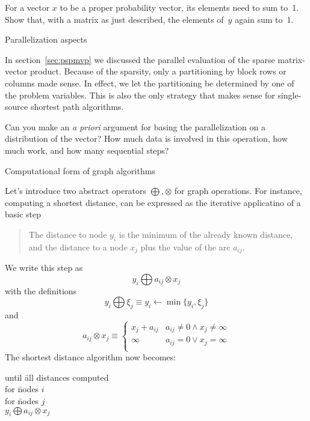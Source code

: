 \begin{exercise}
For a vector $x$ to be a proper probability vector, its elements
need to sum to~1.
Show that, with a matrix as just described,
the elements of~$y$ again sum to~1.
\end{exercise}

 {Parallelization aspects}

In section~\ref{sec:pspmvp} we discussed the parallel evaluation
of the sparse matrix-vector product. Because of the sparsity, 
only a partitioning by block rows or columns made sense.
In effect, we let the partitioning be determined by one of the problem
variables. This is also the only strategy that makes sense for
single-source shortest path algorithms.

\begin{exercise}
  Can you make an \textit{a priori} argument for basing the
  parallelization on a distribution of the vector? How much data is
  involved in this operation, how much work, and how many sequential
  steps?
\end{exercise}

 {Computational form of graph algorithms}
\label{app:graph-mult}

Let's introduce two abstract operators $\bigoplus,\otimes$
for graph operations.
For instance, computing a shortest distance, can be expressed
as the iterative applicatino of a basic step
\begin{quote}
  The distance to node $y_i$ is the minimum of the already known distance,
  and the distance to a node $x_j$ plus the value of the arc $a_{ij}$.
\end{quote}
We write this step as
\[ y_i \bigoplus a_{ij}\otimes x_j \]
with the definitions
\[ y_i\bigoplus \xi_j \equiv y_i\leftarrow \min\{y_i,\xi_j\} \]
and
\[ a_{ij}\otimes x_j \equiv
\begin{cases}
  x_j+a_{ij}&a_{ij}\not=0 \wedge x_j\not=\infty\\
  \infty    &a_{ij}=0 \vee x_j=\infty\\
\end{cases}
\]
The shortest distance algorithm now becomes:

\begin{tabbing}
until \=all distances computed\\
\> for \=nodes $i$\\
\>\> for \=nodes $j$\\
\>\>\> $y_i \bigoplus a_{ij}\otimes x_j$\\
\end{tabbing}

